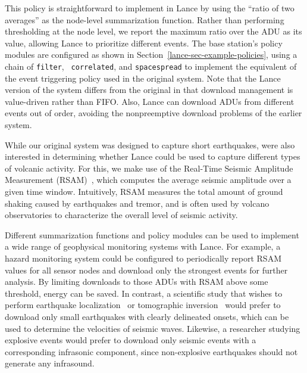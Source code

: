 This policy is straightforward to implement in Lance by using the ``ratio of
two averages'' as the node-level summarization function.  Rather than
performing thresholding at the node level, we report the maximum ratio over
the ADU as its value, allowing Lance to prioritize different events. The base
station's policy modules are configured as shown in
Section~\ref{lance-sec-example-policies}, using a chain of {\tt filter}, {\tt
correlated}, and {\tt spacespread} to implement the equivalent of the event
triggering policy used in the original system. Note that the Lance version of
the system differs from the original in that download management is
value-driven rather than FIFO. Also, Lance can download ADUs from different
events out of order, avoiding the nonpreemptive download problems of the
earlier system.

While our original system was designed to capture short earthquakes, were
also interested in determining whether Lance could be used to capture
different types of volcanic activity. For this, we make use of the Real-Time
Seismic Amplitude Measurement (RSAM)~\cite{rsam}, which computes the average
seismic amplitude over a given time window.  Intuitively, RSAM measures the
total amount of ground shaking caused by earthquakes and tremor, and is often
used by volcano observatories to characterize the overall level of seismic
activity.

Different summarization functions and policy modules can be used to implement
a wide range of geophysical monitoring systems with Lance. For example, a
hazard monitoring system could be configured to periodically report RSAM
values for all sensor nodes and download only the strongest events for
further analysis. By limiting downloads to those ADUs with RSAM above some
threshold, energy can be saved. In contrast, a scientific study that wishes
to perform earthquake localization~\cite{aki-richards-80} or tomographic
inversion~\cite{lees-lindley-94} would prefer to download only small
earthquakes with clearly delineated onsets, which can be used to determine
the velocities of seismic waves. Likewise, a researcher studying explosive
events would prefer to download only seismic events with a corresponding
infrasonic component, since non-explosive earthquakes should not generate any
infrasound.

%
